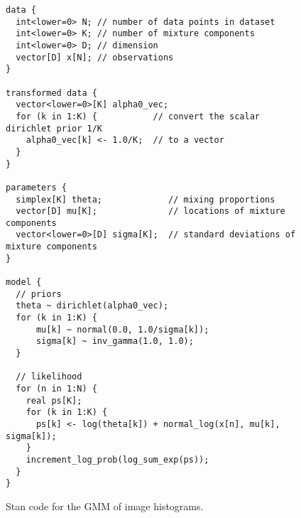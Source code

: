 \documentclass{article}
\begin{document}
\begin{figure}[htbp]
\centering
\begin{lstlisting}
data {
  int<lower=0> N; // number of data points in dataset
  int<lower=0> K; // number of mixture components
  int<lower=0> D; // dimension
  vector[D] x[N]; // observations
}

transformed data {
  vector<lower=0>[K] alpha0_vec;
  for (k in 1:K) {           // convert the scalar dirichlet prior 1/K
    alpha0_vec[k] <- 1.0/K;  // to a vector
  }
}

parameters {
  simplex[K] theta;             // mixing proportions
  vector[D] mu[K];              // locations of mixture components
  vector<lower=0>[D] sigma[K];  // standard deviations of mixture components
}

model {
  // priors
  theta ~ dirichlet(alpha0_vec);
  for (k in 1:K) {
      mu[k] ~ normal(0.0, 1.0/sigma[k]);
      sigma[k] ~ inv_gamma(1.0, 1.0);
  }

  // likelihood
  for (n in 1:N) {
    real ps[K];
    for (k in 1:K) {
      ps[k] <- log(theta[k]) + normal_log(x[n], mu[k], sigma[k]);
    }
    increment_log_prob(log_sum_exp(ps));
  }
}
\end{lstlisting}
\caption{Stan code for the \gls{GMM} of image histograms.}
\label{fig:code_gmm_diag}
\end{figure}
 
\clearpage


\end{document}
